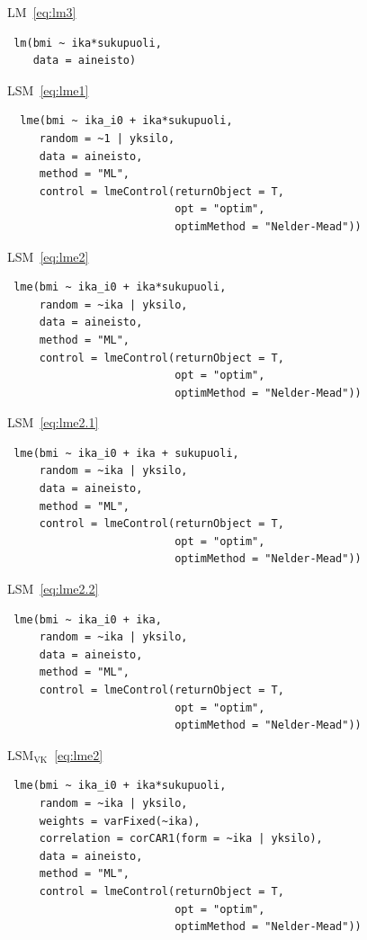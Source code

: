 \documentclass[finnish]{docopts}
\begin{document}
LM~\ref{eq:lm3} \\

\begin{lstlisting}
 lm(bmi ~ ika*sukupuoli,
    data = aineisto)
\end{lstlisting}

LSM~\ref{eq:lme1}\\

\begin{lstlisting}
  lme(bmi ~ ika_i0 + ika*sukupuoli,
     random = ~1 | yksilo,
     data = aineisto,
     method = "ML",
     control = lmeControl(returnObject = T,
                          opt = "optim",
                          optimMethod = "Nelder-Mead"))
\end{lstlisting}

LSM~\ref{eq:lme2}\\

\begin{lstlisting}
 lme(bmi ~ ika_i0 + ika*sukupuoli,
     random = ~ika | yksilo,
     data = aineisto,
     method = "ML",
     control = lmeControl(returnObject = T,
                          opt = "optim",
                          optimMethod = "Nelder-Mead"))
\end{lstlisting}

LSM~\ref{eq:lme2.1}\\

\begin{lstlisting}
 lme(bmi ~ ika_i0 + ika + sukupuoli,
     random = ~ika | yksilo,
     data = aineisto,
     method = "ML",
     control = lmeControl(returnObject = T,
                          opt = "optim",
                          optimMethod = "Nelder-Mead"))
\end{lstlisting}

LSM~\ref{eq:lme2.2}\\

\begin{lstlisting}
 lme(bmi ~ ika_i0 + ika,
     random = ~ika | yksilo,
     data = aineisto,
     method = "ML",
     control = lmeControl(returnObject = T,
                          opt = "optim",
                          optimMethod = "Nelder-Mead"))
\end{lstlisting}

$\text{LSM}_{\text{VK}}$~\ref{eq:lme2}\\

\begin{lstlisting}
 lme(bmi ~ ika_i0 + ika*sukupuoli,
     random = ~ika | yksilo,
     weights = varFixed(~ika),
     correlation = corCAR1(form = ~ika | yksilo),
     data = aineisto,
     method = "ML",
     control = lmeControl(returnObject = T,
                          opt = "optim",
                          optimMethod = "Nelder-Mead"))
\end{lstlisting}
\end{document}
